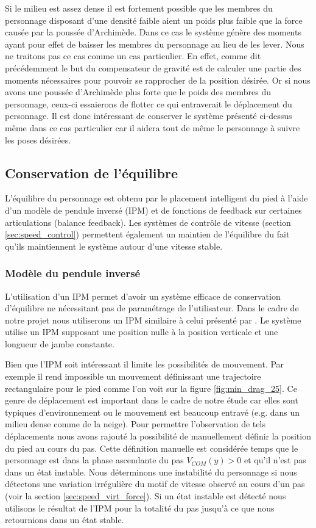 \documentclass[runningheads,a4paper]{llncs}
\begin{document}
Si le milieu est assez dense il est fortement possible que les membres du personnage disposant d'une densité faible aient un poids plus faible que la force causée par la poussée d'Archimède. Dans ce cas le système génère des moments ayant pour effet de baisser les membres du personnage au lieu de les lever. Nous ne traitons pas ce cas comme un cas particulier. En effet, comme dit précédemment le but du compensateur de gravité est de calculer une partie des moments nécessaires pour pouvoir se rapprocher de la position désirée. Or si nous avons une poussée d'Archimède plus forte que le poids des membres du personnage, ceux-ci essaierons de flotter ce qui entraverait le déplacement du personnage. Il est donc intéressant de conserver le système présenté ci-dessus même dans ce cas particulier car il aidera tout de même le personnage à suivre les poses désirées.
\subsection{Conservation de l'équilibre}
%
L'équilibre du personnage est obtenu par le placement intelligent du pied à l'aide d'un modèle de pendule inversé (IPM) et de fonctions de feedback sur certaines articulations (balance feedback). Les systèmes de contrôle de vitesse (section \ref{sec:speed_control}) permettent également un maintien de l'équilibre du fait qu'ils maintiennent le système autour d'une vitesse stable. 
%
\subsubsection{Modèle du pendule inversé}
%
\label{sec:IPM}
L'utilisation d'un IPM permet d'avoir un système efficace de conservation d'équilibre ne nécessitant pas de paramétrage de l'utilisateur. Dans le cadre de notre  projet nous utiliserons un IPM similaire à celui présenté par \cite{coros2010generalized}. Le système utilise un IPM supposant une position nulle à la position verticale et une longueur de jambe constante. 


Bien que l'IPM soit intéressant il limite les possibilités de mouvement. Par exemple il rend impossible un mouvement définissant une trajectoire rectangulaire pour le pied comme l'on voit sur la figure \ref{fig:min_drag_25}. Ce genre de déplacement est important dans le cadre de notre étude car elles sont typiques d'environnement ou le mouvement est beaucoup entravé (e.g. dans un milieu dense comme de la neige). Pour permettre l'observation de tels déplacements nous avons rajouté la possibilité de manuellement définir la position du pied au cours du pas. Cette définition manuelle est considérée temps que le personnage est dans la phase ascendante du pas \(V_{COM}(y)>0\) et qu'il n'est pas dans un état instable. Nous déterminons une instabilité du personnage si nous détectons une variation irrégulière du motif de vitesse observé au cours d'un pas (voir la section \ref{sec:speed_virt_force}). Si un état instable est détecté nous utilisons le résultat de l'IPM pour la totalité du pas jusqu'à ce que nous retournions dans un état stable.
%
\end{document}
